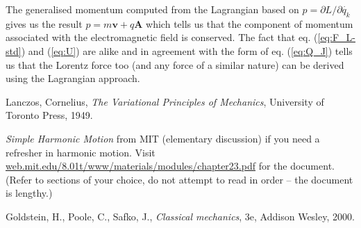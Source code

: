 \documentclass[english,seminar,headertitle]{lecture}
\begin{document}
The generalised momentum computed from the Lagrangian based on $p = \partial L / \partial \dot{q_k}$ gives us the result $p = m\mathbf{v} + q\mathbf{A}$ which tells us that the component of momentum associated with the electromagnetic field is conserved. The fact that eq. (\ref{eq:F_L-std}) and (\ref{eq:U}) are alike and in agreement with the form of eq. (\ref{eq:Q_J}) tells us that the Lorentz force too (and any force of a similar nature) can be derived using the Lagrangian approach.

\begin{thebibliography}{1}
	Lanczos, Cornelius, \textit{The Variational Principles of Mechanics}, University of Toronto Press, 1949.
	
	\textit{Simple Harmonic Motion} from MIT (elementary discussion) if you need a refresher in harmonic motion. Visit \url{web.mit.edu/8.01t/www/materials/modules/chapter23.pdf} for the document. (Refer to sections of your choice, do not attempt to read in order -- the document is lengthy.)
	
	Goldstein, H., Poole, C., Safko, J., \textit{Classical mechanics}, 3e, Addison Wesley, 2000.
\end{thebibliography}
\end{document}
